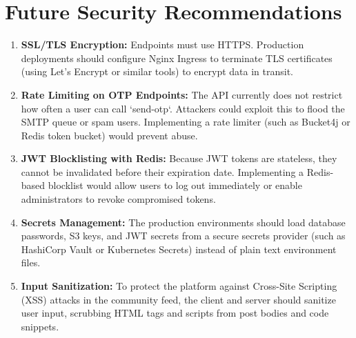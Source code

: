 \section{Future Security Recommendations}
\begin{enumerate}
    \item \textbf{SSL/TLS Encryption:} Endpoints must use HTTPS. Production deployments should configure Nginx Ingress to terminate TLS certificates (using Let's Encrypt or similar tools) to encrypt data in transit.
    \item \textbf{Rate Limiting on OTP Endpoints:} The API currently does not restrict how often a user can call `send-otp`. Attackers could exploit this to flood the SMTP queue or spam users. Implementing a rate limiter (such as Bucket4j or Redis token bucket) would prevent abuse.
    \item \textbf{JWT Blocklisting with Redis:} Because JWT tokens are stateless, they cannot be invalidated before their expiration date. Implementing a Redis-based blocklist would allow users to log out immediately or enable administrators to revoke compromised tokens.
    \item \textbf{Secrets Management:} The production environments should load database passwords, S3 keys, and JWT secrets from a secure secrets provider (such as HashiCorp Vault or Kubernetes Secrets) instead of plain text environment files.
    \item \textbf{Input Sanitization:} To protect the platform against Cross-Site Scripting (XSS) attacks in the community feed, the client and server should sanitize user input, scrubbing HTML tags and scripts from post bodies and code snippets.
\end{enumerate}
